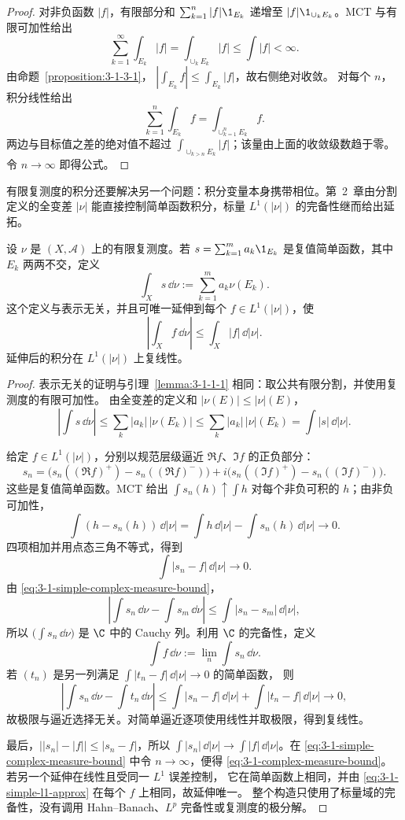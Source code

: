 \begin{proof}
对非负函数 $|f|$，有限部分和
$\sum_{k=1}^n|f|\1_{E_k}$ 递增至 $|f|\1_{\cup_kE_k}$。MCT 与有限可加性给出
\[
 \sum_{k=1}^\infty\int_{E_k}|f|
 =\int_{\cup_kE_k}|f|
 \leq\int|f|<\infty.
\]
由命题~\ref{proposition:3-1-3-1}，
$|\int_{E_k}f|\leq\int_{E_k}|f|$，故右侧绝对收敛。
对每个 $n$，积分线性给出
\[
 \sum_{k=1}^n\int_{E_k}f=\int_{\cup_{k=1}^nE_k}f.
\]
两边与目标值之差的绝对值不超过
$\int_{\cup_{k>n}E_k}|f|$；该量由上面的收敛级数趋于零。令 $n\to\infty$ 即得公式。
\end{proof}

有限复测度的积分还要解决另一个问题：积分变量本身携带相位。第~2~章由分割定义的全变差
$|\nu|$ 能直接控制简单函数积分，标量 $L^1(|\nu|)$ 的完备性继而给出延拓。

\begin{theorem}[复测度积分估计]\label{theorem:3-1-3-4}
设 $\nu$ 是 $(X,\mathcal A)$ 上的有限复测度。若
$s=\sum_{k=1}^ma_k\1_{E_k}$ 是复值简单函数，其中 $E_k$ 两两不交，定义
\[
 \int_Xs\,\dd\nu:=\sum_{k=1}^ma_k\nu(E_k).
\]
这个定义与表示无关，并且可唯一延伸到每个 $f\in L^1(|\nu|)$，使
\[
 \left|\int_Xf\,\dd\nu\right|
 \leq\int_X|f|\,\dd|\nu|.
 \tag{3.1.24}\label{eq:3-1-complex-measure-bound}
\]
延伸后的积分在 $L^1(|\nu|)$ 上复线性。
\end{theorem}

\begin{proof}
表示无关的证明与引理~\ref{lemma:3-1-1-1} 相同：取公共有限分割，并使用复测度的有限可加性。
由全变差的定义和 $|\nu(E)|\leq|\nu|(E)$，
\[
 \left|\int s\,\dd\nu\right|
 \leq\sum_k|a_k|\,|\nu(E_k)|
 \leq\sum_k|a_k|\,|\nu|(E_k)
 =\int|s|\,\dd|\nu|.
 \tag{3.1.25}\label{eq:3-1-simple-complex-measure-bound}
\]

给定 $f\in L^1(|\nu|)$，分别以规范层级逼近 $\Re f$、$\Im f$ 的正负部分：
\[
 s_n=\bigl(s_n((\Re f)^+)-s_n((\Re f)^-)\bigr)
   +i\bigl(s_n((\Im f)^+)-s_n((\Im f)^-)\bigr).
\]
这些是复值简单函数。MCT 给出
$\int s_n(h)\uparrow\int h$ 对每个非负可积的 $h$；由非负可加性，
\[
 \int(h-s_n(h))\,\dd|\nu|
 =\int h\,\dd|\nu|-\int s_n(h)\,\dd|\nu|\longrightarrow0.
\]
四项相加并用点态三角不等式，得到
\[
 \int|s_n-f|\,\dd|\nu|\longrightarrow0.
 \tag{3.1.26}\label{eq:3-1-simple-l1-approx}
\]
由 \eqref{eq:3-1-simple-complex-measure-bound}，
\[
 \left|\int s_n\,\dd\nu-\int s_m\,\dd\nu\right|
 \leq\int|s_n-s_m|\,\dd|\nu|,
\]
所以 $\bigl(\int s_n\,\dd\nu\bigr)$ 是 $\C$ 中的 Cauchy 列。利用 $\C$ 的完备性，定义
\[
 \int f\,\dd\nu:=\lim_n\int s_n\,\dd\nu.
\]
若 $(t_n)$ 是另一列满足 $\int|t_n-f|\,\dd|\nu|\to0$ 的简单函数，
则
\[
 \left|\int s_n\,\dd\nu-\int t_n\,\dd\nu\right|
 \leq\int|s_n-f|\,\dd|\nu|+\int|t_n-f|\,\dd|\nu|\to0,
\]
故极限与逼近选择无关。对简单逼近逐项使用线性并取极限，得到复线性。

最后，$\bigl||s_n|-|f|\bigr|\leq|s_n-f|$，所以
$\int|s_n|\,\dd|\nu|\to\int|f|\,\dd|\nu|$。在
\eqref{eq:3-1-simple-complex-measure-bound} 中令 $n\to\infty$，便得
\eqref{eq:3-1-complex-measure-bound}。若另一个延伸在线性且受同一 $L^1$ 误差控制，
它在简单函数上相同，并由 \eqref{eq:3-1-simple-l1-approx} 在每个 $f$ 上相同，故延伸唯一。
整个构造只使用了标量域的完备性，没有调用 Hahn--Banach、$L^p$ 完备性或复测度的极分解。
\end{proof}


